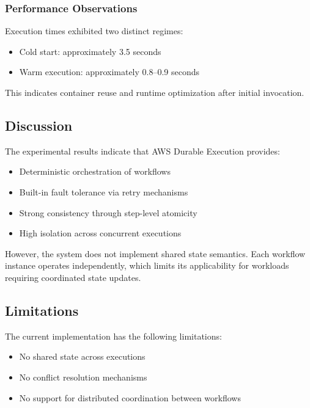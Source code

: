 \subsubsection{Performance Observations}

Execution times exhibited two distinct regimes:

\begin{itemize}
    \item Cold start: approximately 3.5 seconds
    \item Warm execution: approximately 0.8--0.9 seconds
\end{itemize}

This indicates container reuse and runtime optimization after initial invocation.

\subsection{Discussion}

The experimental results indicate that AWS Durable Execution provides:

\begin{itemize}
    \item Deterministic orchestration of workflows
    \item Built-in fault tolerance via retry mechanisms
    \item Strong consistency through step-level atomicity
    \item High isolation across concurrent executions
\end{itemize}

However, the system does not implement shared state semantics. Each workflow instance operates independently, which limits its applicability for workloads requiring coordinated state updates.

\subsection{Limitations}

The current implementation has the following limitations:

\begin{itemize}
    \item No shared state across executions
    \item No conflict resolution mechanisms
    \item No support for distributed coordination between workflows
\end{itemize}

